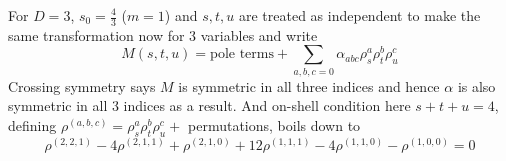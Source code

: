 ﻿\documentclass[12pt,a4paper]{article}
\begin{document}
For $D=3$, $s_{0}=\frac{4}{3}$ ($m=1$) and $s,t,u$ are treated as independent to make the same transformation now for 3 variables and write 
$$
M(s, t, u)=\text{pole terms}+\sum_{a, b, c=0} \alpha_{a b c} \rho_{s}^{a} \rho_{t}^{b} \rho_{u}^{c}
$$
Crossing symmetry says $M$ is symmetric in all three indices and hence $\alpha$ is also symmetric in all 3 indices as a result. And on-shell condition here $s+t+u=4$, defining $\rho^{(a, b,c)}=\rho_{s}^{a} \rho_{t}^{b} \rho_{u}^{c}+$ permutations, boils down to 
$$\rho^{(2,2,1)}-4\rho^{(2,1,1)}+\rho^{(2,1,0)}+12\rho^{(1,1,1)}-4\rho^{(1,1,0)}-\rho^{(1,0,0)}=0$$
\end{document}

